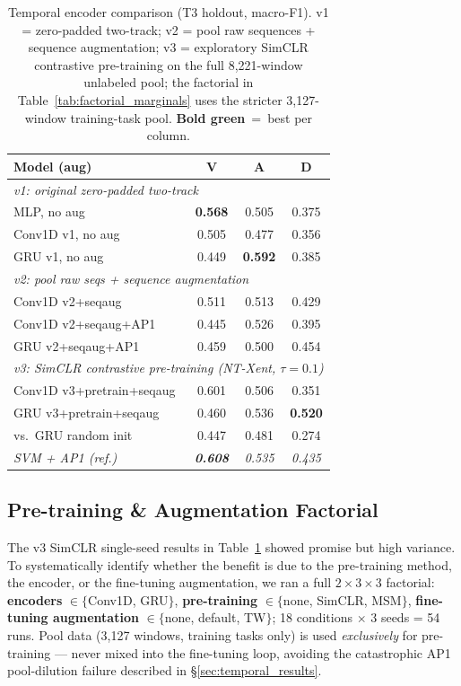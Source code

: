 \documentclass[sigconf,nonacm]{acmart}
\newcommand{\best}[1]{\textbf{\textcolor{bestcol}{#1}}}
\begin{document}
\begin{table}[t]
\caption{Temporal encoder comparison (T3 holdout, macro-F1). v1 = zero-padded two-track;
  v2 = pool raw sequences + sequence augmentation;
  v3 = exploratory SimCLR contrastive pre-training on the full 8{,}221-window
  unlabeled pool; the factorial in Table~\ref{tab:factorial_marginals} uses the
  stricter 3{,}127-window training-task pool.
  \best{Bold green}~=~best per column.}
\label{tab:temporal_models}
\centering
\setlength{\tabcolsep}{4pt}
\small
\begin{tabular}{lccc}
\toprule
\textbf{Model (aug)} & \textbf{V} & \textbf{A} & \textbf{D} \\
\midrule
\multicolumn{4}{l}{\textit{v1: original zero-padded two-track}} \\
MLP, no aug         & \best{0.568} & 0.505 & 0.375 \\
Conv1D v1, no aug   & 0.505 & 0.477 & 0.356 \\
GRU v1, no aug      & 0.449 & \best{0.592} & 0.385 \\
\midrule
\multicolumn{4}{l}{\textit{v2: pool raw seqs + sequence augmentation}} \\
Conv1D v2+seqaug    & 0.511 & 0.513 & 0.429 \\
Conv1D v2+seqaug+AP1& 0.445 & 0.526 & 0.395 \\
GRU v2+seqaug+AP1   & 0.459 & 0.500 & 0.454 \\
\midrule
\multicolumn{4}{l}{\textit{v3: SimCLR contrastive pre-training (NT-Xent, $\tau{=}0.1$)}} \\
Conv1D v3+pretrain+seqaug & 0.601 & 0.506 & 0.351 \\
GRU v3+pretrain+seqaug    & 0.460 & 0.536 & \best{0.520} \\
\quad vs.\ GRU random init& 0.447 & 0.481 & 0.274 \\
\midrule
\textit{SVM + AP1 (ref.)} & \textit{\best{0.608}} & \textit{0.535} & \textit{0.435} \\
\bottomrule
\end{tabular}
\end{table}

\subsection{Pre-training \& Augmentation Factorial}
\label{sec:factorial}

The v3 SimCLR single-seed results in Table~\ref{tab:temporal_models} showed
promise but high variance.
To systematically identify whether the benefit is due to the pre-training
method, the encoder, or the fine-tuning augmentation, we ran a full
$2{\times}3{\times}3$ factorial:
\textbf{encoders} $\in \{$Conv1D, GRU$\}$,
\textbf{pre-training} $\in \{$none, SimCLR, MSM$\}$,
\textbf{fine-tuning augmentation} $\in \{$none, default, TW$\}$;
18 conditions $\times$ 3 seeds = 54 runs.
Pool data (3{,}127 windows, training tasks only) is used \emph{exclusively}
for pre-training --- never mixed into the fine-tuning loop, avoiding the
catastrophic AP1 pool-dilution failure described in \S\ref{sec:temporal_results}.
\end{document}
